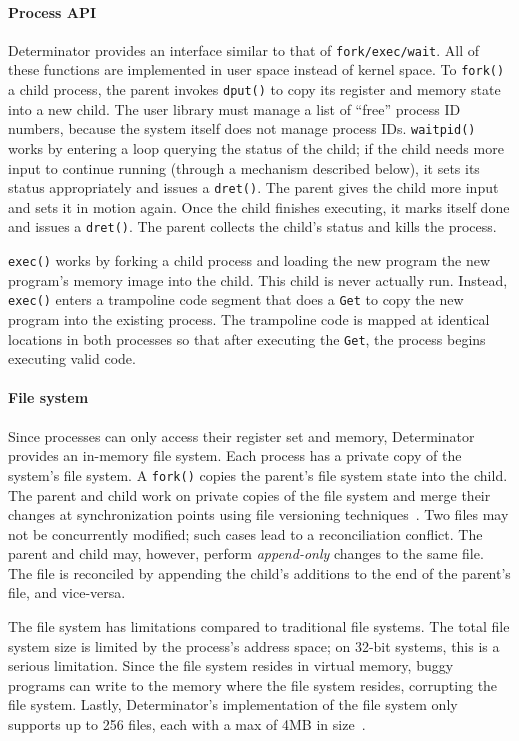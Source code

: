 \paragraph{Process API}
Determinator provides an interface similar to that of {\tt fork/exec/wait}.
All of these functions are implemented in user space instead of kernel space.
To {\tt fork()} a child process, the parent invokes {\tt dput()} to copy its
register and memory state into a new child. The user library must manage a list
of ``free'' process ID numbers, because the system itself does not manage
process IDs. {\tt waitpid()}
works by entering a loop querying the status of the child; if the child needs
more input to continue running (through a mechanism described below), it
sets its status appropriately and issues a {\tt dret()}. The parent gives the
child more input and sets it in motion again. Once the child finishes executing,
it marks itself done and issues a {\tt dret()}. The parent collects the child's
status and kills the process.

{\tt exec()} works by forking a child process and loading the new program
the new program's memory image into the child. This child is never actually run.
Instead, {\tt exec()} enters a trampoline code segment that does a {\tt Get} to
copy the new program into the existing process. The trampoline code is mapped at
identical locations in both processes so that after executing the {\tt Get}, the
process begins executing valid code.

\paragraph{File system}
Since processes can only access their register set and memory, Determinator
provides an in-memory file system. Each process has a private copy of the
system's file system. A {\tt fork()} copies the parent's file system state into
the child. The parent and child work on private copies of the file system and
merge their changes at synchronization points using file versioning
techniques~\cite{parker1983detection}. Two files may not be
concurrently modified; such cases lead to a reconciliation conflict. The parent
and child may, however, perform \emph{append-only} changes to the same file.
The file is reconciled by appending the child's additions to the end of the
parent's file, and vice-versa.

The file system has limitations compared to traditional file systems.
The total file system size is limited
by the process's address space; on 32-bit systems, this is a serious limitation.
Since the file system resides in virtual memory, buggy programs can write to
the memory where the file system resides, corrupting the file system. Lastly,
Determinator's implementation of the file system only supports up to 256 files,
each with a max of 4MB in size~\cite{Aviram10cloud}.

